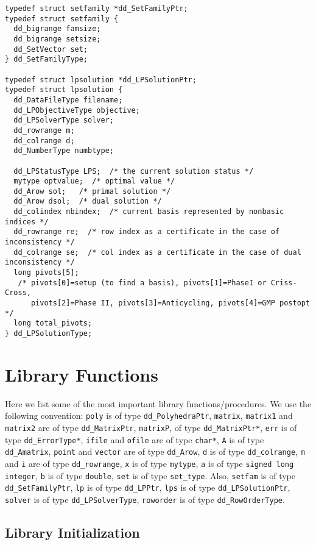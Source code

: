 \documentclass[11pt]{article}
\newcommand {\0} {{\bf 0}}
\begin{document}
\begin{verbatim}
typedef struct setfamily *dd_SetFamilyPtr;
typedef struct setfamily {
  dd_bigrange famsize;
  dd_bigrange setsize;
  dd_SetVector set;  
} dd_SetFamilyType;

typedef struct lpsolution *dd_LPSolutionPtr;
typedef struct lpsolution {
  dd_DataFileType filename;
  dd_LPObjectiveType objective;
  dd_LPSolverType solver; 
  dd_rowrange m;
  dd_colrange d;
  dd_NumberType numbtype;

  dd_LPStatusType LPS;  /* the current solution status */
  mytype optvalue;  /* optimal value */
  dd_Arow sol;   /* primal solution */
  dd_Arow dsol;  /* dual solution */
  dd_colindex nbindex;  /* current basis represented by nonbasic indices */
  dd_rowrange re;  /* row index as a certificate in the case of inconsistency */
  dd_colrange se;  /* col index as a certificate in the case of dual inconsistency */
  long pivots[5]; 
   /* pivots[0]=setup (to find a basis), pivots[1]=PhaseI or Criss-Cross,
      pivots[2]=Phase II, pivots[3]=Anticycling, pivots[4]=GMP postopt  */
  long total_pivots;
} dd_LPSolutionType;

\end{verbatim}

\section{Library Functions}  \label{LIBRARY}

Here we list some of the most important library functions/procedures. 
We use the following convention: 
{\tt poly} is of type {\tt dd\_PolyhedraPtr},
{\tt matrix}, {\tt matrix1} and {\tt matrix2} are of type {\tt dd\_MatrixPtr},
{\tt matrixP}, of type {\tt dd\_MatrixPtr*},
{\tt err} is of type {\tt dd\_ErrorType*}, 
{\tt ifile} and {\tt ofile} are of type {\tt char*},
{\tt A} is of type {\tt dd\_Amatrix},
{\tt point} and {\tt vector} are of type {\tt dd\_Arow},
{\tt d} is of type {\tt dd\_colrange}, 
{\tt m} and {\tt i} are of type {\tt dd\_rowrange},
{\tt x} is of type {\tt mytype}, 
{\tt a} is of type {\tt signed long integer},
{\tt b} is of type {\tt double},
{\tt set} is of type {\tt set\_type}.
  Also,
{\tt setfam} is of type {\tt dd\_SetFamilyPtr},
{\tt lp} is of type {\tt dd\_LPPtr},
{\tt lps} is of type {\tt dd\_LPSolutionPtr},
{\tt solver} is of type {\tt dd\_LPSolverType},
{\tt roworder} is of type {\tt dd\_RowOrderType}.


\subsection{Library Initialization}  \label{Initialization}
\end{document}

